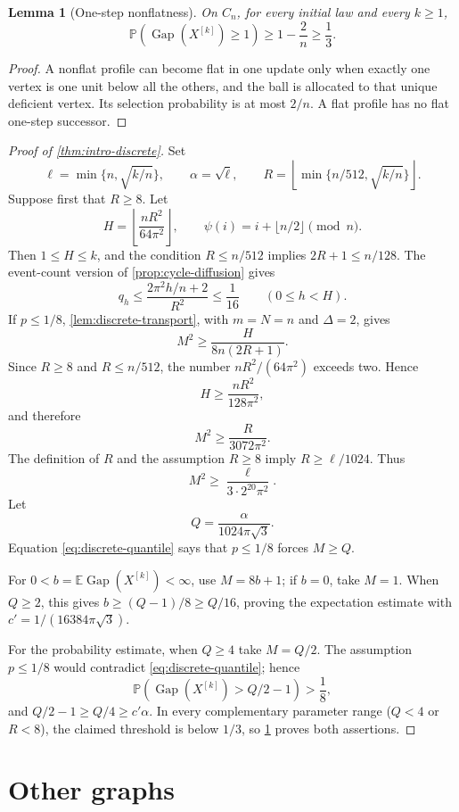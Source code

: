 \documentclass[11pt]{article}
\newtheorem{lemma}[lemma]{Lemma}
\theoremstyle{remark}
\newcommand{\E}{\mathbb{E}}
\newcommand{\Pp}{\mathbb{P}}
\newcommand{\Gap}{\operatorname{Gap}}
\begin{document}
\begin{lemma}[One-step nonflatness]\label{lem:discrete-small}
On $C_n$, for every initial law and every $k\ge1$,
\[
 \Pp(\Gap(X^{[k]})\ge1)\ge1-\frac{2}{n}\ge\frac13.
 \tag{6.9}\label{eq:one-step-nonflat}
\]
\end{lemma}

\begin{proof}
A nonflat profile can become flat in one update only when exactly one vertex is one unit below all the others, and the ball is allocated to that unique deficient vertex. Its selection probability is at most $2/n$. A flat profile has no flat one-step successor.
\end{proof}

\begin{proof}[Proof of \cref{thm:intro-discrete}]
Set
\[
 \ell=\min\{n,\sqrt{k/n}\},
 \qquad
 \alpha=\sqrt\ell,
 \qquad
 R=\left\lfloor\min\{n/512,\sqrt{k/n}\}\right\rfloor.
\]
Suppose first that $R\ge8$. Let
\[
 H=\left\lfloor\frac{nR^2}{64\pi^2}\right\rfloor,
 \qquad
 \psi(i)=i+\lfloor n/2\rfloor\pmod n.
\]
Then $1\le H\le k$, and the condition $R\le n/512$ implies $2R+1\le n/128$. The event-count version of \cref{prop:cycle-diffusion} gives
\[
 q_h\le\frac{2\pi^2h/n+2}{R^2}\le\frac1{16}
 \qquad(0\le h<H).
\]
If $p\le1/8$, \cref{lem:discrete-transport}, with $m=N=n$ and $\Delta=2$, gives
\[
 M^2\ge\frac{H}{8n(2R+1)}.
\]
Since $R\ge8$ and $R\le n/512$, the number $nR^2/(64\pi^2)$ exceeds two. Hence
\[
 H\ge\frac{nR^2}{128\pi^2},
\]
and therefore
\[
 M^2\ge\frac{R}{3072\pi^2}.
\]
The definition of $R$ and the assumption $R\ge8$ imply $R\ge\ell/1024$. Thus
\[
 M^2\ge\frac{\ell}{3\cdot2^{20}\pi^2}.
 \tag{6.10}\label{eq:discrete-quantile}
\]
Let
\[
 Q=\frac{\alpha}{1024\pi\sqrt3}.
\]
Equation \eqref{eq:discrete-quantile} says that $p\le1/8$ forces $M\ge Q$.

For $0<b=\E\Gap(X^{[k]})<\infty$, use $M=8b+1$; if $b=0$, take $M=1$. When $Q\ge2$, this gives $b\ge(Q-1)/8\ge Q/16$, proving the expectation estimate with $c'=1/(16384\pi\sqrt3)$.

For the probability estimate, when $Q\ge4$ take $M=Q/2$. The assumption $p\le1/8$ would contradict \eqref{eq:discrete-quantile}; hence
\[
 \Pp(\Gap(X^{[k]})>Q/2-1)>\frac18,
\]
and $Q/2-1\ge Q/4\ge c'\alpha$. In every complementary parameter range ($Q<4$ or $R<8$), the claimed threshold is below $1/3$, so \cref{lem:discrete-small} proves both assertions.
\end{proof}

\section{Other graphs}\label{sec:graphs}
\end{document}
